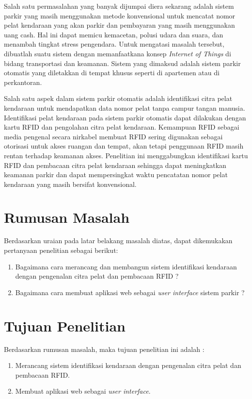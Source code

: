 Salah satu permasalahan yang banyak dijumpai diera sekarang adalah sistem parkir yang masih menggunakan metode konvensional untuk mencatat nomor pelat kendaraan yang akan parkir dan pembayaran yang masih menggunakan uang cash. Hal ini dapat memicu kemacetan, polusi udara dan suara, dan menambah tingkat stress pengendara. Untuk mengatasi masalah tersebut, dibuatlah suatu sistem dengan memanfaatkana konsep \textit{Internet of Things} di bidang transportasi dan keamanan. Sistem yang dimaksud adalah sistem parkir otomatis yang diletakkan di tempat khusus seperti di apartemen atau di perkantoran.

Salah satu aspek dalam sistem parkir otomatis adalah identifikasi citra pelat kendaraan untuk mendapatkan data nomor pelat tanpa campur tangan manusia. Identifikasi pelat kendaraan pada sistem parkir otomatis dapat dilakukan dengan kartu RFID dan pengolahan citra pelat kendaraan. Kemampuan RFID sebagai media pengenal secara nirkabel membuat RFID sering digunakan sebagai otorisasi untuk akses ruangan dan tempat, akan tetapi penggunaan RFID masih rentan terhadap keamanan akses. Penelitian ini menggabungkan identifikasi kartu RFID dan pembacaan citra pelat kendaraan sehingga dapat meningkatkan keamanan parkir dan dapat mempersingkat waktu pencatatan nomor pelat kendaraan yang masih bersifat konvensional.

\section{Rumusan Masalah}
Berdasarkan uraian pada latar belakang masalah diatas, dapat dikemukakan pertanyaan penelitian sebagai berikut:
\begin{enumerate}[topsep=0pt,itemsep=0pt,partopsep=0pt, parsep=0pt]
    \item Bagaimana cara merancang dan membangun sistem identifikasi kendaraan dengan pengenalan citra pelat dan pembacaan RFID ?
    \item Bagaimana cara membuat aplikasi web sebagai \textit{user interface} sistem parkir ?
\end{enumerate}

\section{Tujuan Penelitian}
Berdasarkan rumusan masalah, maka tujuan penelitian ini adalah :
\begin{enumerate}[topsep=0pt,itemsep=0pt,partopsep=0pt, parsep=0pt]
    \item Merancang sistem identifikasi kendaraan dengan pengenalan citra pelat dan pembacaan RFID. 
    \item Membuat aplikasi web sebagai \textit{user interface}.
\end{enumerate}

